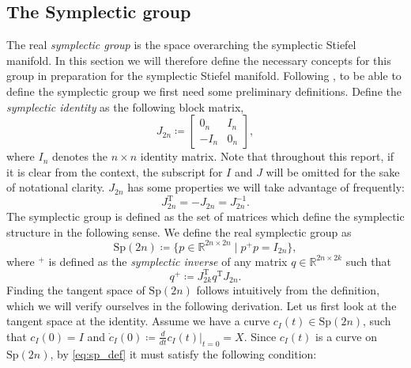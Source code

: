 \subsection{The Symplectic group}
The real \textit{symplectic group} is the space overarching the symplectic Stiefel manifold. In this section we will therefore define the necessary concepts for this group in preparation for the symplectic Stiefel manifold. Following \cite[p.~3]{BendokatZimmermann2021}, to be able to define the symplectic group we first need some preliminary definitions. Define the \textit{symplectic identity} as the following block matrix,
\begin{equation*}
    J_{2n}\coloneqq\begin{bmatrix}
        0_{n} & I_{n} \\
        -I_{n} & 0_{n}
    \end{bmatrix},
\end{equation*}
where $I_{n}$ denotes the $n\times n$ identity matrix. Note that throughout this report, if it is clear from the context, the subscript for $I$ and $J$ will be omitted for the sake of notational clarity.  $J_{2n}$ has some properties we will take advantage of frequently:
\begin{equation}\label{eq:J_2n_properties}
    J_{2n} ^{\mathrm{T}}=-J_{2n}=J_{2n}^{-1}.
\end{equation}
The symplectic group is defined as the set of matrices which define the symplectic structure in the following sense. We define the real symplectic group as %
\begin{equation}\label{eq:sp_def}
    \mathrm{Sp}(2n)\coloneqq \{p\in \mathbb{R}^{2n\times2n} \;|\; p^{+}p=I_{2n}\},
\end{equation}
where $^{+}$ is defined as the \textit{symplectic inverse} of any matrix $q\in\mathbb{R}^{2n\times2k}$ such that 
\begin{equation}\label{eq:symplectic_inverse}
    q^{+}\coloneqq J_{2k}^{\mathrm{T}}q ^{\mathrm{T}}J_{2n}.
\end{equation}
Finding the tangent space of $\mathrm{Sp}(2n)$ follows  intuitively from the definition, which we will verify ourselves in the following derivation. Let us first look at the tangent space at the identity. Assume we have a curve $c_{I}(t)\in \mathrm{Sp}(2n)$, such that $c_{I}(0)=I$ and $\dot{c}_{I}(0)\coloneqq\tfrac{d}{dt}c_{I}(t)|_{t=0}=X$. Since $c_{I}(t)$ is a curve on $\mathrm{Sp}(2n)$, by \eqref{eq:sp_def} it must satisfy the following condition:
